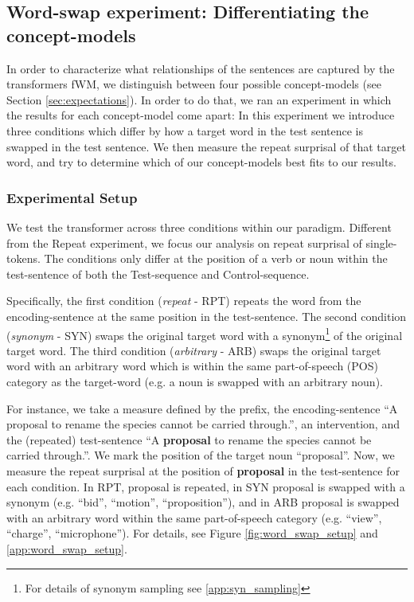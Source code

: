 \subsection{Word-swap experiment: Differentiating the concept-models} \label{exp:word_swap}

In order to characterize what relationships of the sentences are captured by the transformers fWM, we distinguish between four possible concept-models (see Section \ref{sec:expectations}).
In order to do that, we ran an experiment in which the results for each concept-model come apart:
In this experiment we introduce three conditions which differ by how a target word in the test sentence is swapped in the test sentence.
We then measure the repeat surprisal of that target word, and try to determine which of our concept-models best fits to our results.


\subsubsection{Experimental Setup}

We test the transformer across three conditions within our paradigm. Different from the Repeat experiment, we focus our analysis on repeat surprisal of single-tokens. The conditions only differ at the position of a verb or noun within the test-sentence of both the Test-sequence and Control-sequence.

Specifically, the first condition (\textit{repeat} - RPT) repeats the word from the encoding-sentence at the same position in the test-sentence.
The second condition (\textit{synonym} - SYN) swaps the original target word with a synonym\footnote{For details of synonym sampling see \ref{app:syn_sampling}} of the original target word.
The third condition (\textit{arbitrary} - ARB) swaps the original target word with an arbitrary word which is within the same part-of-speech (POS) category as the target-word (e.g. a noun is swapped with an arbitrary noun).

For instance, we take a measure defined by the prefix, the encoding-sentence ``A proposal to rename the species cannot be carried through.'', an intervention, and the (repeated) test-sentence ``A \textbf{proposal} to rename the species cannot be carried through.''. We mark the position of the target noun ``proposal''. Now, we measure the repeat surprisal at the position of \textbf{proposal} in the test-sentence for each condition. In RPT, proposal is repeated, in SYN proposal is swapped with a synonym (e.g. ``bid'', ``motion'', ``proposition''), and in ARB proposal is swapped with an arbitrary word within the same part-of-speech category (e.g. ``view'', ``charge'', ``microphone''). For details, see Figure \ref{fig:word_swap_setup} and \ref{app:word_swap_setup}.

